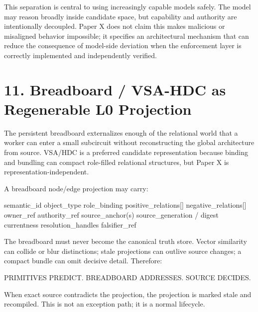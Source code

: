 \documentclass[
  10pt,
  letterpaper,
]{article}
\newenvironment{Shaded}{}{}
\newcommand{\NormalTok}[1]{#1}
\begin{document}
This separation is central to using increasingly capable models safely.
The model may reason broadly inside candidate space, but capability and
authority are intentionally decoupled. Paper X does not claim this makes
malicious or misaligned behavior impossible; it specifies an
architectural mechanism that can reduce the consequence of model-side
deviation when the enforcement layer is correctly implemented and
independently verified.

\section{11. Breadboard / VSA-HDC as Regenerable L0
Projection}\label{11-breadboard--vsa-hdc-as-regenerable-l0-projection}

The persistent breadboard externalizes enough of the relational world
that a worker can enter a small subcircuit without reconstructing the
global architecture from source. VSA/HDC is a preferred candidate
representation because binding and bundling can compact role-filled
relational structures, but Paper X is representation-independent.

A breadboard node/edge projection may carry:

\begin{Shaded}
\begin{Highlighting}[]
\NormalTok{semantic\_id}
\NormalTok{object\_type}
\NormalTok{role\_binding}
\NormalTok{positive\_relations[]}
\NormalTok{negative\_relations[]}
\NormalTok{owner\_ref}
\NormalTok{authority\_ref}
\NormalTok{source\_anchor(s)}
\NormalTok{source\_generation / digest}
\NormalTok{currentness}
\NormalTok{resolution\_handles}
\NormalTok{falsifier\_ref}
\end{Highlighting}
\end{Shaded}

The breadboard must never become the canonical truth store. Vector
similarity can collide or blur distinctions; stale projections can
outlive source changes; a compact bundle can omit decisive detail.
Therefore:

\begin{Shaded}
\begin{Highlighting}[]
\NormalTok{PRIMITIVES PREDICT.}
\NormalTok{BREADBOARD ADDRESSES.}
\NormalTok{SOURCE DECIDES.}
\end{Highlighting}
\end{Shaded}

When exact source contradicts the projection, the projection is marked
stale and recompiled. This is not an exception path; it is a normal
lifecycle.
\end{document}
